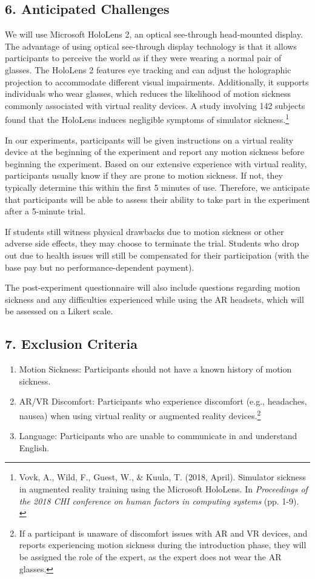 \documentclass[A4,11pt]{article}
\begin{document}
\subsection*{6. Anticipated Challenges}
We will use Microsoft HoloLens 2, an optical see-through head-mounted display. The advantage of using optical see-through display technology is that it allows participants to perceive the world as if they were wearing a normal pair of glasses. The HoloLens 2 features eye tracking and can adjust the holographic projection to accommodate different visual impairments. Additionally, it supports individuals who wear glasses, which reduces the likelihood of motion sickness commonly associated with virtual reality devices. A study involving 142 subjects found that the HoloLens induces negligible symptoms of simulator sickness.\footnote{Vovk, A., Wild, F., Guest, W., \& Kuula, T. (2018, April). Simulator sickness in augmented reality training using the Microsoft HoloLens. In \textit{Proceedings of the 2018 CHI conference on human factors in computing systems} (pp. 1-9).\\}

In our experiments, participants will be given instructions on a virtual reality device at the beginning of the experiment and report any motion sickness before beginning the experiment. Based on our extensive experience with virtual reality, participants usually know if they are prone to motion sickness. If not, they typically determine this within the first 5 minutes of use. Therefore, we anticipate that participants will be able to assess their ability to take part in the experiment after a 5-minute trial.

If students still witness physical drawbacks due to motion sickness or other adverse side effects, they may choose to terminate the trial. Students who drop out due to health issues will still be compensated for their participation (with the base pay but no performance-dependent payment).

The post-experiment questionnaire will also include questions regarding motion sickness and any difficulties experienced while using the AR headsets, which will be assessed on a Likert scale.

\subsection*{7. Exclusion Criteria}
\begin{enumerate}
\item 
Motion Sickness: Participants should not have a known history of motion sickness.

\item 
AR/VR Discomfort: Participants who experience discomfort (e.g., headaches, nausea) when using virtual reality or augmented reality devices.\footnote{If a participant is unaware of discomfort issues with AR and VR devices, and reports experiencing motion sickness during the introduction phase, they will be assigned the role of the expert, as the expert does not wear the AR glasses.}

\item 
Language: Participants who are unable to communicate in and understand English.
\end{enumerate}
\end{document}
